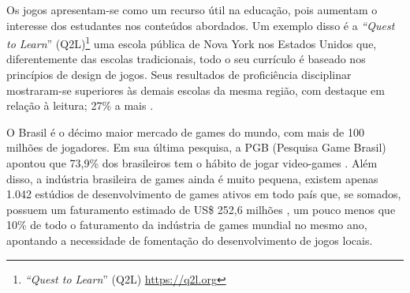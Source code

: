 Os jogos apresentam-se como um recurso útil na educação, pois aumentam o interesse dos estudantes nos conteúdos abordados. Um exemplo disso é a \textit{“Quest to Learn}” (Q2L)\footnote{\textit{“Quest to Learn}” (Q2L) \url{https://q2l.org}} uma escola pública de Nova York nos Estados Unidos que, diferentemente das escolas tradicionais, todo o seu currículo é baseado nos princípios de design de jogos. Seus resultados de proficiência disciplinar mostraram-se superiores às demais escolas da mesma região, com destaque em relação à leitura; 27\% a mais \cite{Q2L}.

O Brasil é o décimo maior mercado de games do mundo, com mais de 100 milhões de jogadores. Em sua última pesquisa, a PGB (Pesquisa Game Brasil) apontou que 73,9\% dos brasileiros tem o hábito de jogar video-games \cite{PGB}. Além disso, a indústria brasileira de games ainda é muito pequena, existem apenas 1.042 estúdios de desenvolvimento de games ativos em todo país que, se somados, possuem um faturamento estimado de US\$ 252,6 milhões \cite{Abragames}, um pouco menos que 10\% de todo o faturamento da indústria de games mundial no mesmo ano, apontando a necessidade de fomentação do desenvolvimento de jogos locais.









